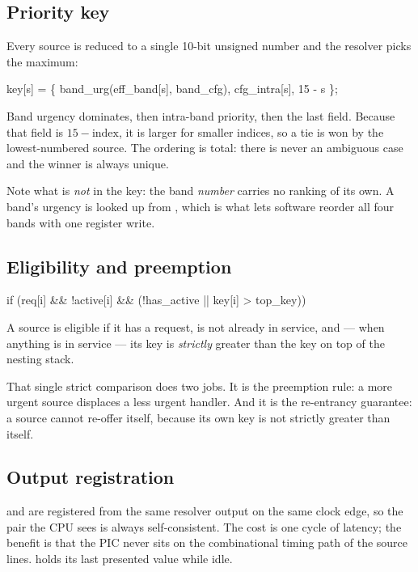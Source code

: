 \subsection{Priority key}

Every source is reduced to a single 10-bit unsigned number and the resolver picks
the maximum:

\begin{center}
\ttfamily\small
key[s] = \{ band\_urg(eff\_band[s], band\_cfg), cfg\_intra[s], 15 - s \};
\end{center}

Band urgency dominates, then intra-band priority, then the last field. Because
that field is $15-\text{index}$, it is larger for smaller indices, so a tie is
won by the lowest-numbered source. The ordering is total: there is never an
ambiguous case and the winner is always unique.

Note what is \emph{not} in the key: the band \emph{number} carries no ranking of
its own. A band's urgency is looked up from , which is what
lets software reorder all four bands with one register write.

\subsection{Eligibility and preemption}

\begin{center}
\ttfamily\small
if (req[i] \&\& !active[i] \&\& (!has\_active || key[i] > top\_key))
\end{center}

A source is eligible if it has a request, is not already in service, and --- when
anything is in service --- its key is \emph{strictly} greater than the key on top
of the nesting stack.

That single strict comparison does two jobs. It is the preemption rule: a more
urgent source displaces a less urgent handler. And it is the re-entrancy
guarantee: a source cannot re-offer itself, because its own key is not strictly
greater than itself.

\subsection{Output registration}

 and  are registered from the same resolver
output on the same clock edge, so the pair the CPU sees is always
self-consistent. The cost is one cycle of latency; the benefit is that the PIC
never sits on the combinational timing path of the source lines. 
holds its last presented value while idle.


